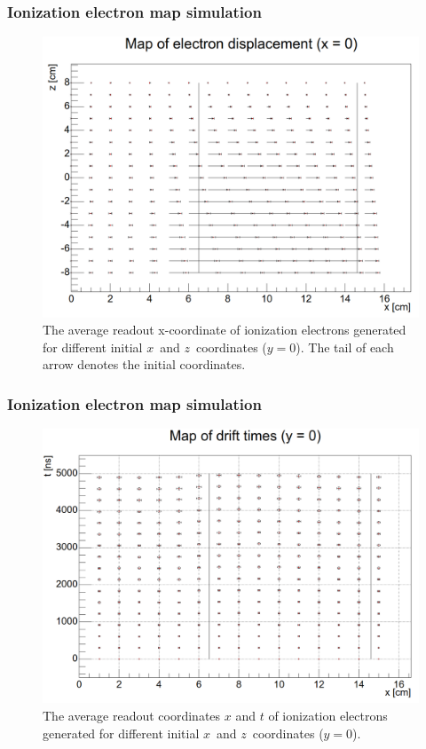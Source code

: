 \documentclass{beamer}
\begin{document}
	\begin{frame}
		\frametitle{Ionization electron map simulation}
		\begin{figure}
			\centering
			\includegraphics[height=0.65\textheight]{images/map_xz.png}
			\caption{The average readout x-coordinate of ionization electrons generated for different initial $x$~and $z$~coordinates ($y=0$). The tail of each arrow denotes the initial coordinates.}
		\end{figure}
	\end{frame}
	\begin{frame}
		\frametitle{Ionization electron map simulation}
		\begin{figure}
			\centering
			\includegraphics[height=0.65\textheight]{images/map_xt.png}
			\caption{The average readout coordinates $x$ and $t$ of ionization electrons generated for different initial $x$~and $z$~coordinates ($y=0$).}
		\end{figure}
	\end{frame}
\end{document}
